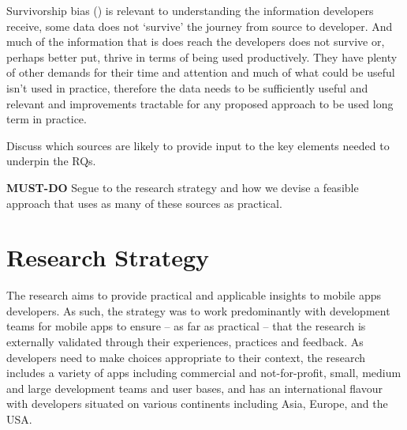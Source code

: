 Survivorship bias (\cite{wikipedia_survivorship_bias}) is relevant to understanding the information developers receive, some data does not `survive' the journey from source to developer. And much of the information that is does reach the developers does not survive or, perhaps better put, thrive in terms of being used productively. They have plenty of other demands for their time and attention and much of what could be useful isn't used in practice, therefore the data needs to be sufficiently useful and relevant and improvements tractable for any proposed approach to be used long term in practice.


Discuss which sources are likely to provide input to the key elements needed to underpin the RQs.

\textbf{MUST-DO} Segue to the research strategy and how we devise a feasible approach that uses as many of these sources as practical.


\section{Research Strategy}
The research aims to provide practical and applicable insights to mobile apps developers. As such, the strategy was to work predominantly with development teams for mobile apps to ensure -- as far as practical -- that the research is externally validated through their experiences, practices and feedback. As developers need to make choices appropriate to their context, the research includes a variety of apps including commercial and not-for-profit, small, medium and large development teams and user bases, and has an international flavour with developers situated on various continents including Asia, Europe, and the USA.

